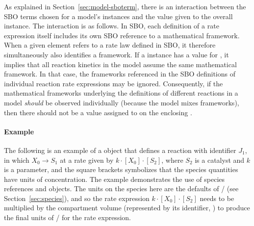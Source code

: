 As explained in Section~\ref{sec:model-sboterm}, there is an
interaction between the SBO terms chosen for a model's \KineticLaw
instances and the  value given to the overall
\Model instance.  The interaction is as follows.  In
SBO, each definition of a rate expression itself includes its own
SBO reference to a mathematical framework.  When a given
\KineticLaw element refers to a rate law defined in SBO, it
therefore simultaneously also identifies a framework.  If a \Model
instance has a value for , it implies that all
reaction kinetics in the model assume the same mathematical
framework.  In that case, the frameworks referenced in the SBO
definitions of individual reaction rate expressions may be
ignored.  Consequently, if the mathematical frameworks underlying
the definitions of different reactions in a model \emph{should} be
observed individually (\eg because the model mixes frameworks),
then there should not be a value assigned to  on
the enclosing \Model.


\paragraph{Example}

The following is an example of a \Reaction object that defines
a reaction with identifier $J_1$, in which $X_0 \rightarrow S_1$
at a rate given by $k \cdot [X_0] \cdot [S_2]$, where $S_2$ is a catalyst
and $k$ is a parameter, and the square brackets symbolizes that
the species quantities have units of concentration.  The example
demonstrates the use of species references and \KineticLaw
objects.  The units on the species here are the defaults of
/ (see
Section~\ref{sec:species}), and so the rate expression $k \cdot [X_0]
 \cdot [S_2]$ needs to be multiplied by the compartment volume
(represented by its identifier, ) to produce the final
units of / for the rate
expression.


